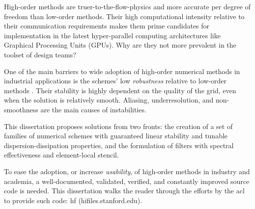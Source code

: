 
High-order methods are truer-to-the-flow-physics and more accurate per degree of freedom than low-order methods. Their high computational intensity relative to their communication requirements makes them prime candidates for implementation in the latest hyper-parallel computing architectures like Graphical Processing Units (GPUs). Why are they not more prevalent in the toolset of design teams? 

One of the main barriers to wide adoption of high-order numerical methods in industrial applications is the schemes' low \emph{robustness} relative to low-order methods \cite{vincent2011facilitating}. Their stability is highly dependent on the quality of the grid, even when the solution is relatively smooth. Aliasing, underresolution, and non-smoothness are the main causes of instabilities.

This dissertation proposes solutions from two fronts: the creation of a set of families of numerical schemes with guaranteed linear stability and tunable dispersion-dissipation properties, and the formulation of filters with spectral effectiveness and element-local stencil. 

To ease the adoption, or increase \emph{usability}, of high-order methods in industry and academia, a well-documented, validated, verified, and constantly improved source code is needed. This dissertation walks the reader through the efforts by the \gls{acl} to provide such code: \gls{hf} (hifiles.stanford.edu).
